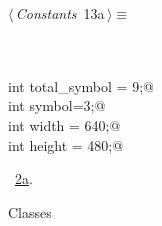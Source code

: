 \documentclass{article}
\renewcommand{\NWtarget}[2]{\hypertarget{#1}{#2}}
\renewcommand{\NWlink}[2]{\hyperlink{#1}{#2}}
\begin{document}
\begin{flushleft} \small
\begin{minipage}{\linewidth}\label{scrap19}\raggedright\small
\NWtarget{nuweb13a}{} $\langle\,${\it Constants}\nobreak\ {\footnotesize {13a}}$\,\rangle\equiv$
\vspace{-1ex}
\begin{list}{}{} \item
\mbox{}\verb@@\\
\mbox{}\verb@@\\
\mbox{}\verb@const int total_symbol = 9;@\\
\mbox{}\verb@const int symbol=3;@\\
\mbox{}\verb@const int width = 640;@\\
\mbox{}\verb@const int height = 480;@\\
\mbox{}\verb@@{\NWsep}
\end{list}
\vspace{-1.5ex}
\footnotesize
\begin{list}{}{\setlength{\itemsep}{-\parsep}\setlength{\itemindent}{-\leftmargin}}
\item \NWtxtMacroRefIn\ \NWlink{nuweb2a}{2a}.

\item{}
\end{list}
\end{minipage}\vspace{4ex}
\end{flushleft}
Classes
\end{document}
